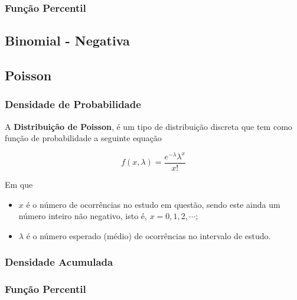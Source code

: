 \documentclass[
]{book}
\begin{document}
\hypertarget{funuxe7uxe3o-percentil-2}{%
\subsubsection*{Função Percentil}\label{funuxe7uxe3o-percentil-2}}

\hypertarget{binomial---negativa}{%
\subsection{Binomial - Negativa}\label{binomial---negativa}}

\hypertarget{poisson}{%
\subsection{Poisson}\label{poisson}}

\hypertarget{densidade-de-probabilidade-3}{%
\subsubsection*{Densidade de Probabilidade}\label{densidade-de-probabilidade-3}}

A \textbf{Distribuição de Poisson}, é um tipo de distribuição discreta que tem como função de probabilidade a seguinte equação

\begin{equation}
f(x,\lambda) = \frac{e^{-\lambda} \lambda^x}{x!}
\end{equation}

Em que

\begin{itemize}
\item
  \(x\) é o número de ocorrências no estudo em questão, sendo este ainda um número inteiro não negativo, isto é, \(x = 0, 1, 2, \cdots\);
\item
  \(\lambda\) é o número esperado (médio) de ocorrências no intervalo de estudo.
\end{itemize}

\hypertarget{densidade-acumulada-3}{%
\subsubsection*{Densidade Acumulada}\label{densidade-acumulada-3}}

\hypertarget{funuxe7uxe3o-percentil-3}{%
\subsubsection*{Função Percentil}\label{funuxe7uxe3o-percentil-3}}
\end{document}
